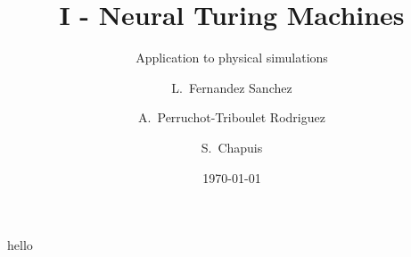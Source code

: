 \documentclass{beamer}
\title{I - Neural Turing Machines}
\subtitle{Application to physical simulations}
\author[Lucia Fernandez Sanchez, Alexandra Perruchot-Triboulet Rodriguez, Samuel Chapuis]{L.~Fernandez Sanchez \and A.~Perruchot-Triboulet Rodriguez \and S.~Chapuis}
\date{\today}
\begin{document}
\frame{\titlepage}
\begin{frame}
  hello
\end{frame}
















    

   
        

    


    
\end{document}
